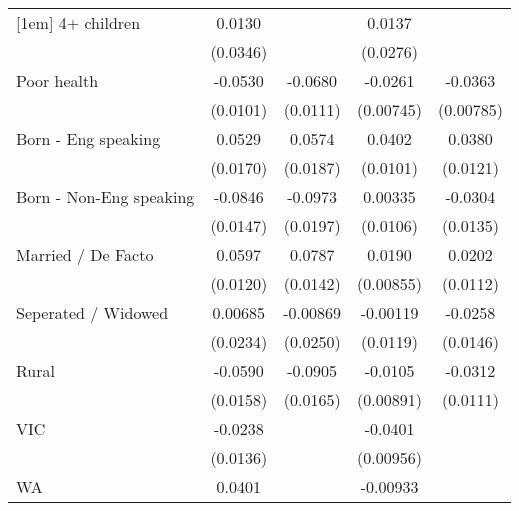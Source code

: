 {\begin{tabular}{l*{4}{c}}
[1em]
4+ children         &      0.0130         &                     &      0.0137         &                     \\
                    &    (0.0346)         &                     &    (0.0276)         &                     \\
[1em]
Poor health         &     -0.0530\sym{***}&     -0.0680\sym{***}&     -0.0261\sym{***}&     -0.0363\sym{***}\\
                    &    (0.0101)         &    (0.0111)         &   (0.00745)         &   (0.00785)         \\
[1em]
Born - Eng speaking &      0.0529\sym{**} &      0.0574\sym{**} &      0.0402\sym{***}&      0.0380\sym{**} \\
                    &    (0.0170)         &    (0.0187)         &    (0.0101)         &    (0.0121)         \\
[1em]
Born - Non-Eng speaking&     -0.0846\sym{***}&     -0.0973\sym{***}&     0.00335         &     -0.0304\sym{*}  \\
                    &    (0.0147)         &    (0.0197)         &    (0.0106)         &    (0.0135)         \\
[1em]
Married / De Facto  &      0.0597\sym{***}&      0.0787\sym{***}&      0.0190\sym{*}  &      0.0202         \\
                    &    (0.0120)         &    (0.0142)         &   (0.00855)         &    (0.0112)         \\
[1em]
Seperated / Widowed &     0.00685         &    -0.00869         &    -0.00119         &     -0.0258         \\
                    &    (0.0234)         &    (0.0250)         &    (0.0119)         &    (0.0146)         \\
[1em]
Rural               &     -0.0590\sym{***}&     -0.0905\sym{***}&     -0.0105         &     -0.0312\sym{**} \\
                    &    (0.0158)         &    (0.0165)         &   (0.00891)         &    (0.0111)         \\
[1em]
VIC                 &     -0.0238         &                     &     -0.0401\sym{***}&                     \\
                    &    (0.0136)         &                     &   (0.00956)         &                     \\
[1em]
WA                  &      0.0401\sym{*}  &                     &    -0.00933         &                     \\

\end{tabular}}
